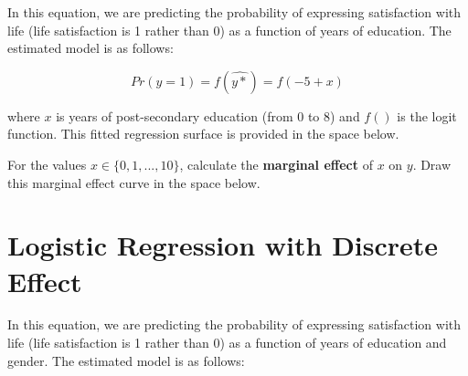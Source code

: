 \documentclass[a4paper,12pt]{article}
\begin{document}
In this equation, we are predicting the probability of expressing satisfaction with life (life satisfaction is 1 rather than 0) as a function of years of education. The estimated model is as follows:

\begin{equation}
Pr(y = 1) = f(\hat{y\ast}) = f(-5 + x)
\end{equation}

\noindent where $x$ is years of post-secondary education (from 0 to 8) and $f()$ is the logit function. This fitted regression surface is provided in the space below. 

\begin{center}
\end{center}

\noindent For the values $x \in \{0,1,...,10\}$, calculate the \textbf{marginal effect} of $x$ on $y$. Draw this marginal effect curve in the space below.

\begin{center}
\end{center}


\section{Logistic Regression with Discrete Effect}

In this equation, we are predicting the probability of expressing satisfaction with life (life satisfaction is 1 rather than 0) as a function of years of education and gender. The estimated model is as follows:
\end{document}
